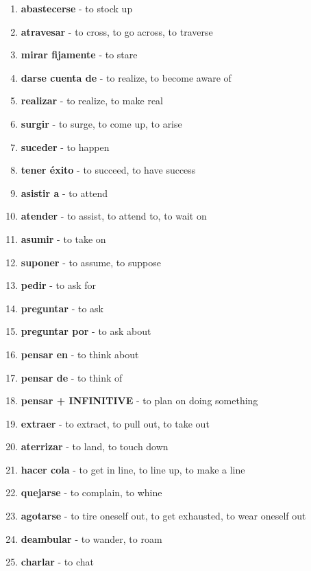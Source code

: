 \documentclass[12pt]{article}
\begin{document}
\begin{enumerate}
                \item \textbf{abastecerse} - to stock up
                \item \textbf{atravesar} - to cross, to go across, to traverse
                \item \textbf{mirar fijamente} - to stare
                \item \textbf{darse cuenta de} - to realize, to become aware of
                \item \textbf{realizar} - to realize, to make real
                \item \textbf{surgir} - to surge, to come up, to arise
                \item \textbf{suceder} - to happen      
                \item \textbf{tener éxito} - to succeed, to have success
                \item \textbf{asistir a} - to attend
                \item \textbf{atender} - to assist, to attend to, to wait on
                \item \textbf{asumir} - to take on
                \item \textbf{suponer} - to assume, to suppose
                \item \textbf{pedir} - to ask for
                \item \textbf{preguntar} - to ask
                \item \textbf{preguntar por} - to ask about
                \item \textbf{pensar en} - to think about
                \item \textbf{pensar de} - to think of
                \item \textbf{pensar + INFINITIVE} - to plan on doing something
                \item \textbf{extraer} - to extract, to pull out, to take out
                \item \textbf{aterrizar} - to land, to touch down
                \item \textbf{hacer cola} - to get in line, to line up, to make a line
                \item \textbf{quejarse} - to complain, to whine
                \item \textbf{agotarse} - to tire oneself out, to get exhausted, to wear oneself out
                \item \textbf{deambular} - to wander, to roam
                \item \textbf{charlar} - to chat

\end{enumerate}
\end{document}
